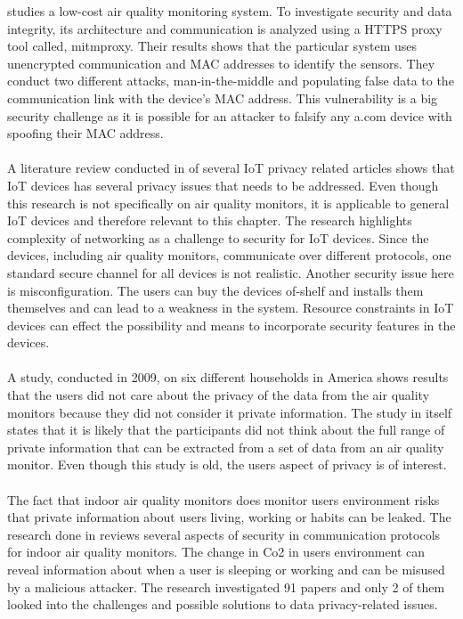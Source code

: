 \cite{SecurityAndDataIntInAQM} studies a low-cost air quality monitoring system. To investigate security and data integrity, its architecture and communication is analyzed using a HTTPS proxy tool called, mitmproxy. Their results shows that the particular system uses unencrypted communication and MAC addresses to identify the sensors. They conduct two different attacks, man-in-the-middle and populating false data to the communication link with the device's MAC address. This vulnerability is a big security challenge as it is possible for an attacker to falsify any a.com device with spoofing their MAC address. \cite{SecurityAndDataIntInAQM}
\\\\
A literature review conducted in \cite{PrivacyOnGeneralIoT} of several IoT privacy related articles shows that IoT devices has several privacy issues that needs to be addressed. Even though this research is not specifically on air quality monitors, it is applicable to general IoT devices and therefore relevant to this chapter. The research highlights complexity of networking as a challenge to security for IoT devices. Since the devices, including air quality monitors, communicate over different protocols, one standard secure channel for all devices is not realistic. Another security issue here is misconfiguration. The users can buy the devices of-shelf and installs them themselves and can lead to a weakness in the system. Resource constraints in IoT devices can effect the possibility and means to incorporate security features in the devices. \cite{PrivacyOnGeneralIoT}
\\\\
A study, conducted in 2009, on six different households in America shows results that the users did not care about the privacy of the data from the air quality monitors because they did not consider it private information. \cite{inAirPrivacy} The study in itself states that it is likely that the participants did not think about the full range of private information that can be extracted from a set of data from an air quality monitor. Even though this study is old, the users aspect of privacy is of interest.
\\\\
The fact that indoor air quality monitors does monitor users environment risks that private information about users living, working or habits can be leaked. \cite{IAQMonitorCommunicationReview} The research done in \cite{IAQMonitorCommunicationReview} reviews several aspects of security in communication protocols for indoor air quality monitors. The change in Co2 in users environment can reveal information about when a user is sleeping or working and can be misused by a malicious attacker. The research investigated 91 papers and only 2 of them looked into the challenges and possible solutions to data privacy-related issues.  

